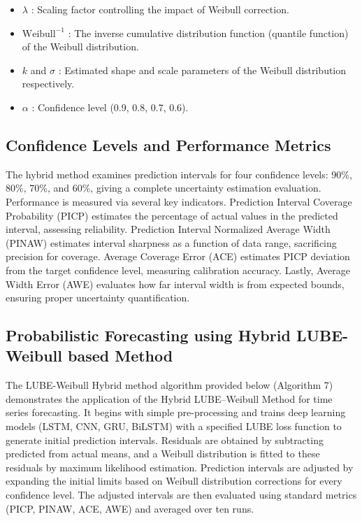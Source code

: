 \begin{itemize}
    \item \( \lambda \) : Scaling factor controlling the impact of Weibull correction.
    \item \( \text{Weibull}^{-1} \) : The inverse cumulative distribution function (quantile function) of the Weibull distribution.
    \item \( k \) and \( \sigma \) : Estimated shape and scale parameters of the Weibull distribution respectively.
    \item \( \alpha \) : Confidence level (0.9, 0.8, 0.7, 0.6).
\end{itemize}
\clearpage
\subsection{Confidence Levels and Performance Metrics}
The hybrid method examines prediction intervals for four confidence levels: 90\%, 80\%, 70\%, and 60\%, giving a complete uncertainty estimation evaluation. Performance is measured via several key indicators. Prediction Interval Coverage Probability (PICP) estimates the percentage of actual values in the predicted interval, assessing reliability. Prediction Interval Normalized Average Width (PINAW) estimates interval sharpness as a function of data range, sacrificing precision for coverage. Average Coverage Error (ACE) estimates PICP deviation from the target confidence level, measuring calibration accuracy. Lastly, Average Width Error (AWE) evaluates how far interval width is from expected bounds, ensuring proper uncertainty quantification.

\subsection{Probabilistic Forecasting using Hybrid LUBE-Weibull based Method}

The LUBE-Weibull Hybrid method algorithm provided below (Algorithm 7) demonstrates the application of the Hybrid LUBE–Weibull Method for time series forecasting. It begins with simple pre-processing and trains deep learning models (LSTM, CNN, GRU, BiLSTM) with a specified LUBE loss function to generate initial prediction intervals. Residuals are obtained by subtracting predicted from actual means, and a Weibull distribution is fitted to these residuals by maximum likelihood estimation. Prediction intervals are adjusted by expanding the initial limits based on Weibull distribution corrections for every confidence level. The adjusted intervals are then evaluated using standard metrics (PICP, PINAW, ACE, AWE) and averaged over ten runs.


